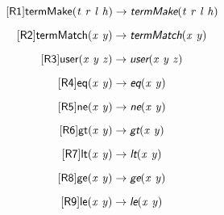 \documentclass[10pt,leqno,fleqn]{article}
\newcommand{\artVariable}[1]{\mbox{\em #1\/}}
\newcommand{\artConstructor}[1]{\mbox{\sf #1}}
\newcommand{\artSpecial}[1]{\mbox{\sf\em #1}}
\begin{document}
\begin{equation}
\tag*{[\artConstructor{\sf R1}]}\artConstructor{\sf termMake}(\artVariable{t}\ \artVariable{r}\ \artVariable{l}\ \artVariable{h})\rightarrow \artSpecial{termMake}(\artVariable{t}\ \artVariable{r}\ \artVariable{l}\ \artVariable{h})
\end{equation}

\begin{equation}
\tag*{[\artConstructor{\sf R2}]}\artConstructor{\sf termMatch}(\artVariable{x}\ \artVariable{y})\rightarrow \artSpecial{termMatch}(\artVariable{x}\ \artVariable{y})
\end{equation}

\begin{equation}
\tag*{[\artConstructor{\sf R3}]}\artConstructor{\sf user}(\artVariable{x}\ \artVariable{y}\ \artVariable{z})\rightarrow \artSpecial{user}(\artVariable{x}\ \artVariable{y}\ \artVariable{z})
\end{equation}

\begin{equation}
\tag*{[\artConstructor{\sf R4}]}\artConstructor{\sf eq}(\artVariable{x}\ \artVariable{y})\rightarrow \artSpecial{eq}(\artVariable{x}\ \artVariable{y})
\end{equation}

\begin{equation}
\tag*{[\artConstructor{\sf R5}]}\artConstructor{\sf ne}(\artVariable{x}\ \artVariable{y})\rightarrow \artSpecial{ne}(\artVariable{x}\ \artVariable{y})
\end{equation}

\begin{equation}
\tag*{[\artConstructor{\sf R6}]}\artConstructor{\sf gt}(\artVariable{x}\ \artVariable{y})\rightarrow \artSpecial{gt}(\artVariable{x}\ \artVariable{y})
\end{equation}

\begin{equation}
\tag*{[\artConstructor{\sf R7}]}\artConstructor{\sf lt}(\artVariable{x}\ \artVariable{y})\rightarrow \artSpecial{lt}(\artVariable{x}\ \artVariable{y})
\end{equation}

\begin{equation}
\tag*{[\artConstructor{\sf R8}]}\artConstructor{\sf ge}(\artVariable{x}\ \artVariable{y})\rightarrow \artSpecial{ge}(\artVariable{x}\ \artVariable{y})
\end{equation}

\begin{equation}
\tag*{[\artConstructor{\sf R9}]}\artConstructor{\sf le}(\artVariable{x}\ \artVariable{y})\rightarrow \artSpecial{le}(\artVariable{x}\ \artVariable{y})
\end{equation}
\end{document}
